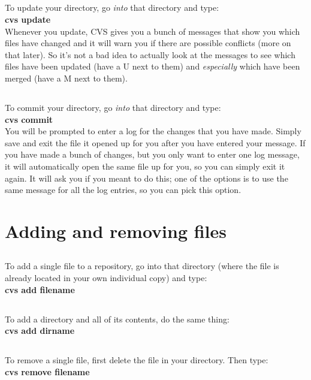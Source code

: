 \documentclass[12pt, letterpaper]{article}
\begin{document}
  \subsection{} 
To update your directory, go {\it into} that directory 
and type:\\
      {\bf cvs update }\\
Whenever you update, CVS gives you a bunch of messages that show you
which files have changed and it will warn you if there are possible
conflicts (more on that later). So it's not a bad idea to actually
look at the messages to see which files have been updated (have a U
next to them) and {\it especially} which have been merged (have a M
next to them).
  \subsection{} 
To commit your directory, go {\it into} that directory 
and type:\\
      {\bf cvs commit }\\
      You will be prompted to enter a log for the changes that you
have made. Simply save and exit the file it opened up for you after
you have entered your message. If you have made a bunch of changes,
but you only want to enter one log message, it will automatically open 
the same file up for you, so you can simply exit it again. It will ask 
you if you meant to do this; one of the options is to use the
same message for all the log entries, so you can pick this option.

\section{Adding and removing files}
  \subsection{} 
To add a single file to a repository, go into that
directory (where the file is already located in your own individual
copy) and type:\\
      {\bf cvs add filename }\\
  \subsection{} 
To add a directory and all of its contents, do the same thing:\\
      {\bf cvs add dirname }\\
  \subsection{} 
To remove a single file, first delete the file in your
directory. Then type:\\
      {\bf cvs remove filename }\\
\end{document}
